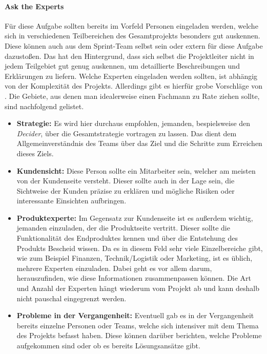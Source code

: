 \paragraph{Ask the Experts}
\label{sec:Sprint-Tag1-AtE}
Für diese Aufgabe sollten bereits im Vorfeld Personen eingeladen werden, welche sich in verschiedenen Teilbereichen des Gesamtprojekts besonders gut auskennen. Diese können auch aus dem Sprint-Team selbst sein oder extern für diese Aufgabe dazustoßen. Das hat den Hintergrund, dass sich selbst die Projektleiter nicht in jedem Teilgebiet gut genug auskennen, um detaillierte Beschreibungen und Erklärungen zu liefern. Welche Experten eingeladen werden sollten, ist abhängig von der Komplexität des Projekts. Allerdings gibt es hierfür grobe Vorschläge von \citeauthor{Sprint}.
Die Gebiete, aus denen man idealerweise einen Fachmann zu Rate ziehen sollte, sind nachfolgend gelistet. 
\begin{itemize}
	\item \textbf{Strategie:}
	Es wird hier durchaus empfohlen, jemanden, bespielsweise den \textit{Decider}, über die Gesamtstrategie vortragen zu lassen. Das dient dem Allgemeinverständnis des Teams über das Ziel und die Schritte zum Erreichen dieses Ziels. 
	\item \textbf{Kundensicht:}
	Diese Person sollte ein Mitarbeiter sein, welcher am meisten von der Kundenseite versteht. Dieser sollte auch in der Lage sein, die Sichtweise der Kunden präzise zu erklären und mögliche Risiken oder interessante Einsichten aufbringen.
	\item \textbf{Produktexperte:}
	Im Gegensatz zur Kundenseite ist es außerdem wichtig, jemanden einzuladen, der die Produktseite vertritt. Dieser sollte die Funktionalität des Endproduktes kennen und über die Entstehung des Produkts Bescheid wissen. Da es in diesem Feld sehr viele Einzelbereiche gibt, wie zum Beispiel Finanzen, Technik/Logistik oder Marketing, ist es üblich, mehrere Experten einzuladen. Dabei geht es vor allem darum, herauszufinden, wie diese Informationen zusammenpassen können. Die Art und Anzahl der Experten hängt wiederum vom Projekt ab und kann deshalb nicht pauschal eingegrenzt werden.
	\item \textbf{Probleme in der Vergangenheit:}
	Eventuell gab es in der Vergangenheit bereits einzelne Personen oder Teams, welche sich intensiver mit dem Thema des Projekts befasst haben. Diese können darüber berichten, welche Probleme aufgekommen sind oder ob es bereits Lösungsansätze gibt.
\end{itemize}

